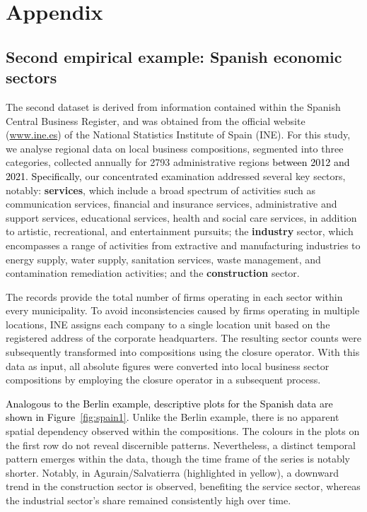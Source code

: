 \documentclass[12pt]{article}
\theoremstyle{plain}
\theoremstyle{definition}
\begin{document}
\section*{Appendix}


\subsection*{Second empirical example: Spanish economic sectors}\label{sec:spain}

The second dataset is derived from information contained within the Spanish Central Business Register, and was obtained from the official website (\url{www.ine.es}) of the National Statistics Institute of Spain (INE). For this study, we analyse regional data on local business compositions, segmented into three categories, collected annually for 2793 administrative regions \textcolor{black}{between 2012 and 2021. Specifically,} our concentrated examination addressed several key sectors, notably: \textbf{services}, which include a broad spectrum of activities such as communication services, financial and insurance services, administrative and support services, educational services, health and social care services, in addition to artistic, recreational, and entertainment pursuits; the \textbf{industry} sector, which encompasses a range of activities from extractive and manufacturing industries to energy supply, water supply, sanitation services, waste management, and contamination remediation activities; and the \textbf{construction} sector.

The records provide the total number of firms operating in each sector within every municipality. To avoid inconsistencies caused by firms operating in multiple locations, INE assigns each company to a single location unit based on the registered address of the corporate headquarters. The resulting sector counts were subsequently transformed into compositions using the closure operator. With this data as input, all absolute figures were converted into local business sector compositions by employing the closure operator in a subsequent process.

\textcolor{black}{Analogous to the Berlin example, descriptive plots for the Spanish data are shown in Figure~\ref{fig:spain1}.} Unlike the Berlin example, there is no apparent spatial dependency observed within the compositions. The colours in the plots on the first row do not reveal discernible patterns. Nevertheless, a distinct temporal pattern emerges within the data, though the time frame of the series is notably shorter. Notably, in Agurain/Salvatierra (highlighted in yellow), a downward trend in the construction sector is observed, benefiting the service sector, whereas the industrial sector's share remained consistently high over time.
\end{document}
